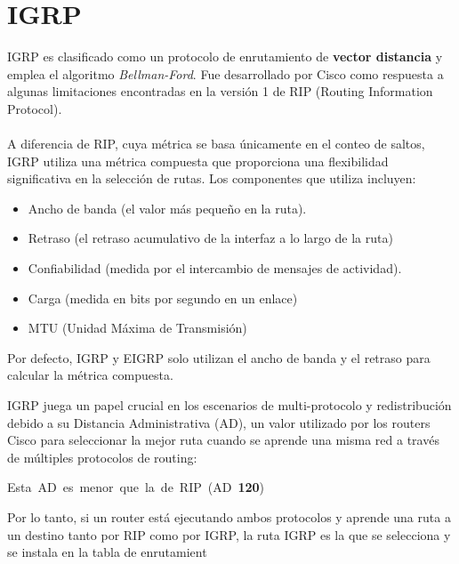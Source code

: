 \documentclass[a5paper]{book}%
\begin{document}
  
  \section{IGRP}
  
  IGRP es clasificado como un protocolo de enrutamiento de \textbf{vector distancia} y emplea el algoritmo \textit{Bellman-Ford}. Fue desarrollado por Cisco como respuesta a algunas limitaciones encontradas en la versión 1 de RIP (Routing Information Protocol).\\\\
  
  A diferencia de RIP, cuya métrica se basa únicamente en el conteo de saltos, IGRP utiliza una métrica compuesta que proporciona una flexibilidad significativa en la selección de rutas. Los componentes que utiliza incluyen:
  
  \begin{itemize}
  	\item Ancho de banda (el valor más pequeño en la ruta).
  	\item Retraso (el retraso acumulativo de la interfaz a lo largo de la ruta)
  	\item Confiabilidad (medida por el intercambio de mensajes de actividad).
  	\item Carga (medida en bits por segundo en un enlace)
  	\item MTU (Unidad Máxima de Transmisión)
  \end{itemize}

  Por defecto, IGRP y EIGRP solo utilizan el ancho de banda y el retraso para calcular la métrica compuesta.
  
  IGRP juega un papel crucial en los escenarios de multi-protocolo y redistribución debido a su Distancia Administrativa (AD), un valor utilizado por los routers Cisco para seleccionar la mejor ruta cuando se aprende una misma red a través de múltiples protocolos de routing:
\begin{center}
\end{center}
  
  \begin{center}
   \mbox{Esta AD es menor que la de RIP (AD \textbf{120})}
  \end{center}
  
  
  Por lo tanto, si un router está ejecutando ambos protocolos y aprende una ruta a un destino tanto por RIP como por IGRP, la ruta IGRP es la que se selecciona y se instala en la tabla de enrutamient
  
\end{document}
